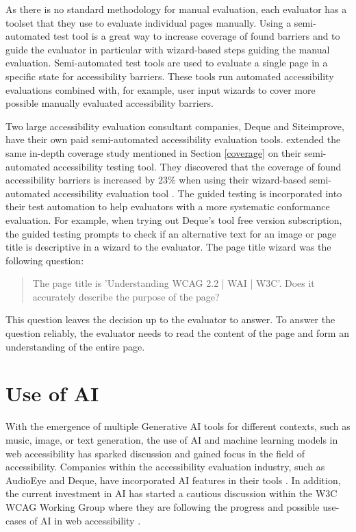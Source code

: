 As there is no standard methodology for manual evaluation, each evaluator has a toolset that they use to evaluate individual pages manually. Using a semi-automated test tool is a great way to increase coverage of found barriers and to guide the evaluator in particular with wizard-based steps guiding the manual evaluation. Semi-automated test tools are used to evaluate a single page in a specific state for accessibility barriers. These tools run automated accessibility evaluations combined with, for example, user input wizards to cover more possible manually evaluated accessibility barriers. 

Two large accessibility evaluation consultant companies, Deque and Siteimprove, have their own paid semi-automated accessibility evaluation tools. \textcite{dequecoverage_semi} extended the same in-depth coverage study mentioned in Section \ref{coverage} on their semi-automated accessibility testing tool. They discovered that the coverage of found accessibility barriers is increased by 23\% when using their wizard-based semi-automated accessibility evaluation tool \citep{dequecoverage_semi}. The guided testing is incorporated into their test automation to help evaluators with a more systematic conformance evaluation. For example, when trying out Deque's tool free version subscription, the guided testing prompts to check if an alternative text for an image or page title is descriptive in a wizard to the evaluator. The page title wizard was the following question: \blockquote{The page title is 'Understanding WCAG 2.2 | WAI | W3C'. Does it accurately describe the purpose of the page?}. This question leaves the decision up to the evaluator to answer. To answer the question reliably, the evaluator needs to read the content of the page and form an understanding of the entire page.

\section{Use of AI}

With the emergence of multiple Generative AI tools for different contexts, such as music, image, or text generation, the use of AI and machine learning models in web accessibility has sparked discussion and gained focus in the field of accessibility. Companies within the accessibility evaluation industry, such as AudioEye and Deque, have incorporated AI features in their tools \citep{deque_igt, boia_improve_accessibility}. In addition, the current investment in AI has started a cautious discussion within the W3C WCAG Working Group where they are following the progress and possible use-cases of AI in web accessibility \citep{ai_wcag_email}. 

